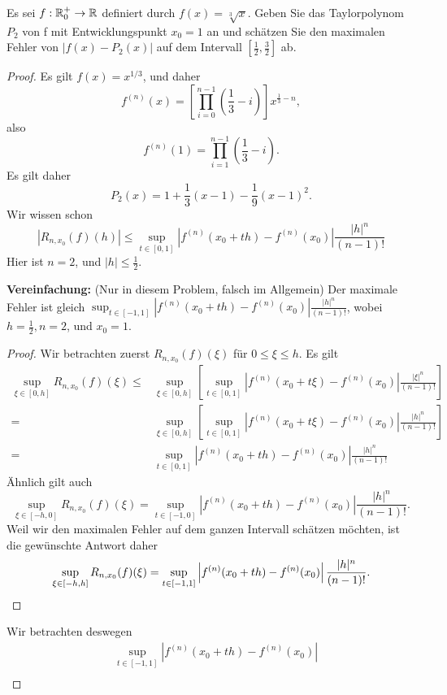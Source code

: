 \begin{Problem}
	Es sei $f : \mathbb{R}_0^+ \to \mathbb{R}$ definiert durch $f (x) = \sqrt[3]{x}$. Geben Sie das Taylorpolynom $P_2$ von f mit Entwicklungspunkt $x_0 = 1$ an und schätzen Sie den maximalen Fehler von $|f(x) - P_2(x)|$ auf dem Intervall $\left[ \frac{1}{2},\frac{3}{2} \right] $ ab.
\end{Problem}
\begin{proof}
	Es gilt $f(x)=x^{1 / 3}$, und daher
	\[
		f^{(n)}(x)=\left[\prod_{i=0}^{n-1} \left( \frac{1}{3}-i \right) \right]x^{\frac{1}{3}-n} 
	,\] 
	also
	\[
		f^{(n)}(1)=\prod_{i=1}^{n-1} \left( \frac{1}{3}-i \right)  
	.\] 
	Es gilt daher
	\[
	P_2(x)=1+\frac{1}{3}(x-1)-\frac{1}{9}(x-1)^2
	.\] 
	Wir wissen schon
	\begin{equation}\tag{5.6.20}
		\left| R_{n,x_0}(f)(h) \right| \le \sup_{t\in[0,1]}\left| f^{(n)}(x_0+th)-f^{(n)}(x_0) \right| \frac{|h|^n}{(n-1)!}
	\end{equation}
	Hier ist $n=2$, und $|h|\le \frac{1}{2}$. 
\begin{tcolorbox}
	\textbf{Vereinfachung:} (Nur in diesem Problem, falsch im Allgemein) Der maximale Fehler ist gleich $\sup_{t\in [-1,1]}\left| f^{(n)}(x_0+th)-f^{(n)}(x_0) \right| \frac{|h|^n}{(n-1)!}$, wobei $h=\frac{1}{2},n=2$, und $x_0=1$.
\begin{proof}
	Wir betrachten zuerst $R_{n,x_0}(f)(\xi)$ f\"{u}r $0\le\xi\le h$. Es gilt
	\begin{align*}
		\sup_{\xi\in [0,h]}R_{n,x_0}(f)(\xi)\le& \sup_{\xi\in [0,h]}\left[\sup_{t\in [0,1]}\left| f^{(n)}(x_0+t\xi)-f^{(n)}(x_0) \right| \frac{|\xi|^n}{(n-1)!}\right]\\
		=& \sup_{\xi\in [0,h]}\left[\sup_{t\in [0,1]}\left| f^{(n)}(x_0+t\xi)-f^{(n)}(x_0) \right| \frac{|h|^n}{(n-1)!} \right] \\
		=&\sup_{t\in [0,1]}\left| f^{(n)}(x_0+th)-f^{(n)}(x_0) \right| \frac{|h|^n}{(n-1)!}
	\end{align*}
	Ähnlich gilt auch
	\[
		\sup_{\xi\in[-h,0]}R_{n,x_0}(f)(\xi)=\sup_{t\in [-1,0]}\left| f^{(n)}(x_0+th)-f^{(n)}(x_0) \right| \frac{|h|^n}{(n-1)!}
	.\] 
	Weil wir den maximalen Fehler auf dem ganzen Intervall schätzen möchten, ist die gewünschte Antwort daher
	\[
		\sup_{\xi\in[-h,h]}R_{n,x_0}(f)(\xi)=\sup_{t\in[-1,1]}\left| f^{(n)}(x_0+th)-f^{(n)}(x_0) \right| \frac{|h|^n}{(n-1)!}
	.\qedhere\] 
\end{proof}
\end{tcolorbox}
Wir betrachten deswegen
\begin{align*}
	&\sup_{t\in [-1,1]}\left| f^{(n)}(x_0+th)-f^{(n)}(x_0) \right|\\

\end{align*}
\end{proof}
